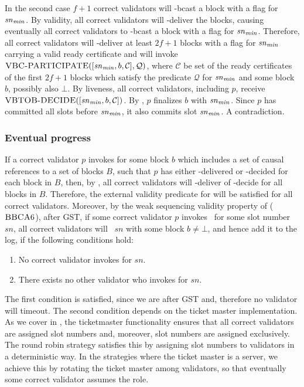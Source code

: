 In the second case $f+1$ correct validators will \primitivesmall-bcast a block with a \finalize flag for $\mathit{sn}_{\mathit{min}}$.
By \primitive validity, all correct validators will \primitivesmall-deliver the blocks, causing eventually all correct validators to \primitivesmall-bcast a block with a \finalize flag for $\mathit{sn}_{\mathit{min}}$.
Therefore, all correct validators will \primitivesmall-deliver at least $2f+1$ blocks with a \finalize flag for $\mathit{sn}_{\mathit{min}}$ carrying a valid ready certificate  and will invoke
$\textsc{VBC-PARTICIPATE}([\mathit{sn}_{\mathit{min}}, b,\mathcal{C}],\mathcal{Q})$,
where $\mathcal{C}$ be set of the ready certificates of the first $2f+1$ blocks which satisfy the predicate $\mathcal{Q}$ for $\mathit{sn}_{\mathit{min}}$ and some block $b$, possibly also $\bot$.
By \vbc liveness, all correct validators, including $p$, receive $\textsc{VBTOB-DECIDE}([\mathit{sn}_{\mathit{min}}, b,\mathcal{C}])$.
By , $p$ finalizes $b$ with $\mathit{sn}_{\mathit{min}}$.
Since $p$ has committed all slots before $\mathit{sn}_{\mathit{min}}$, it also commits slot $\mathit{sn}_{\mathit{min}}$.
A contradiction.

\subsubsection{Eventual progress}
\label{sec:growth}
If a correct validator $p$ invokes \primitive for some block $b$ which includes a set of causal references to a set of blocks $B$, such that $p$ has either \primitivesmall-delivered or \vbc-decided for each block in $B$, then, by , all correct validators will \primitivesmall-deliver
	of \vbc-decide for all blocks in $B$.
Therefore, the external validity predicate for \primitive will be satisfied for all correct validators.
Moreover, by the weak sequencing validity property of \primitive ($\textsc{BBCA}6$), after GST, if some correct validator $p$ invokes \bbcacast\ for some slot number $sn$, all correct validators will \bbcadeliver\ $sn$ with some block $b\neq\bot$, and hence add it to the log, if the following conditions hold: 
\begin{enumerate}
	\item No correct validator invokes \bbcaabort for $sn$.
	\item There exists no other validator who invokes \primitive for $sn$.
\end{enumerate}

The first condition is satisfied, since we are after GST and, therefore no validator will timeout.
The second condition depends on the ticket master implementation.
As we cover in , the ticketmaster functionality ensures that all correct validators are assigned slot numbers and, moreover, slot numbers are assigned exclusively.
The round robin strategy satisfies this by assigning slot numbers to validators in a deterministic way.
In the strategies where the ticket master is a server, we achieve this by rotating the ticket master among validators, so that eventually some correct validator assumes the role.

